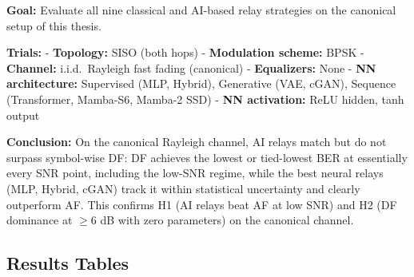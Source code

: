 \textbf{Goal:} Evaluate all nine classical and AI-based relay strategies on the canonical setup of this thesis.

\textbf{Trials:} - \textbf{Topology:} SISO (both hops) - \textbf{Modulation scheme:} BPSK - \textbf{Channel:} i.i.d.\ Rayleigh fast fading (canonical) - \textbf{Equalizers:} None - \textbf{NN architecture:} Supervised (MLP, Hybrid), Generative (VAE, cGAN), Sequence (Transformer, Mamba-S6, Mamba-2 SSD) - \textbf{NN activation:} ReLU hidden, tanh output

\textbf{Conclusion:} On the canonical Rayleigh channel, AI relays match but do not surpass symbol-wise DF: DF achieves the lowest or tied-lowest BER at essentially every SNR point, including the low-SNR regime, while the best neural relays (MLP, Hybrid, cGAN) track it within statistical uncertainty and clearly outperform AF. This confirms H1 (AI relays beat AF at low SNR) and H2 (DF dominance at $\geq 6$ dB with zero parameters) on the canonical channel.

\subsection{Results Tables}\label{sec:results-tables}


